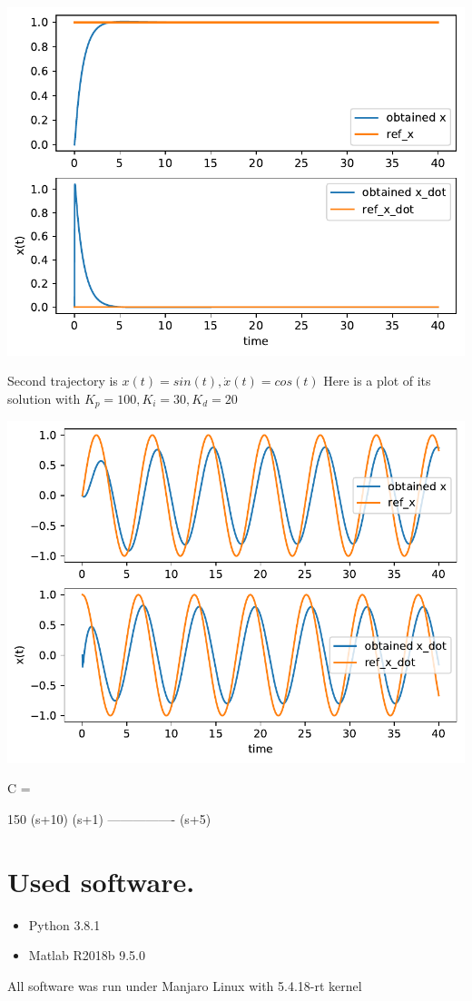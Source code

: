 \documentclass[a4paper,12pt]{article}
\begin{document}
    \begin{center}
        \includegraphics[width=\linewidth]{PID100-30-20.pdf}
    \end{center}
    Second trajectory is $x(t)=sin(t), \dot x(t) = cos(t)$
    Here is a plot of its solution with $K_p = 100, K_i = 30, K_d = 20$
    \begin{center}
        \includegraphics[width=\linewidth]{2PID100-30-20.pdf}
    \end{center}
    C =
 
  150 (s+10) (s+1)
  ----------------
       (s+5) 
\section{Used software.}
\begin{itemize}
    \item Python 3.8.1
    \item Matlab R2018b 9.5.0
\end{itemize}
All software was run under Manjaro Linux with 5.4.18-rt kernel
\end{document}
